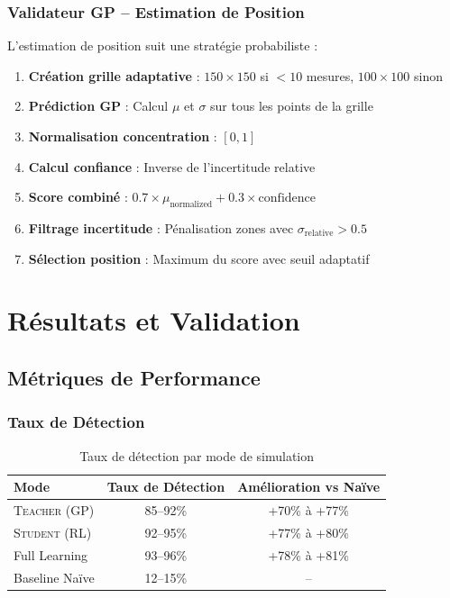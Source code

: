 \documentclass[12pt,a4paper]{article}
\newcommand{\teacher}{\textsc{Teacher}}
\newcommand{\student}{\textsc{Student}}
\newcommand{\gp}{\textsc{GP}}
\newcommand{\rl}{\textsc{RL}}
\begin{document}
\subsubsection{Validateur \gp{} -- Estimation de Position}

L'estimation de position suit une stratégie probabiliste :

\begin{enumerate}
    \item \textbf{Création grille adaptative} : $150 \times 150$ si $< 10$ mesures, $100 \times 100$ sinon
    \item \textbf{Prédiction \gp{}} : Calcul $\mu$ et $\sigma$ sur tous les points de la grille
    \item \textbf{Normalisation concentration} : $[0, 1]$
    \item \textbf{Calcul confiance} : Inverse de l'incertitude relative
    \item \textbf{Score combiné} : $0.7 \times \mu_{\text{normalized}} + 0.3 \times \text{confidence}$
    \item \textbf{Filtrage incertitude} : Pénalisation zones avec $\sigma_{\text{relative}} > 0.5$
    \item \textbf{Sélection position} : Maximum du score avec seuil adaptatif
\end{enumerate}

\section{Résultats et Validation}

\subsection{Métriques de Performance}

\subsubsection{Taux de Détection}

\begin{table}[H]
\centering
\begin{tabular}{lcc}
\toprule
\textbf{Mode} & \textbf{Taux de Détection} & \textbf{Amélioration vs Naïve} \\
\midrule
\teacher{} (\gp{}) & 85--92\% & +70\% à +77\% \\
\student{} (\rl{}) & 92--95\% & +77\% à +80\% \\
Full Learning & 93--96\% & +78\% à +81\% \\
Baseline Naïve & 12--15\% & -- \\
\bottomrule
\end{tabular}
\caption{Taux de détection par mode de simulation}
\end{table}
\end{document}
